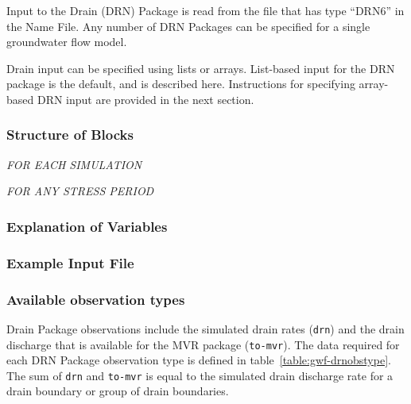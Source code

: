 Input to the Drain (DRN) Package is read from the file that has type ``DRN6'' in the Name File.  Any number of DRN Packages can be specified for a single groundwater flow model.

Drain input can be specified using lists or arrays.  List-based input for the DRN package is the default, and is described here.  Instructions for specifying array-based DRN input are provided in the next section.

\vspace{5mm}
\subsubsection{Structure of Blocks}
\vspace{5mm}

\noindent \textit{FOR EACH SIMULATION}


\vspace{5mm}
\noindent \textit{FOR ANY STRESS PERIOD}

\packageperioddescription

\vspace{5mm}
\subsubsection{Explanation of Variables}
\begin{description}

\end{description}

\vspace{5mm}
\subsubsection{Example Input File}


\vspace{5mm}
\subsubsection{Available observation types}
Drain Package observations include the simulated drain rates (\texttt{drn}) and the drain discharge that is available for the MVR package (\texttt{to-mvr}). The data required for each DRN Package observation type is defined in table~\ref{table:gwf-drnobstype}. The sum of \texttt{drn} and \texttt{to-mvr} is equal to the simulated drain discharge rate for a drain boundary or group of drain boundaries.


